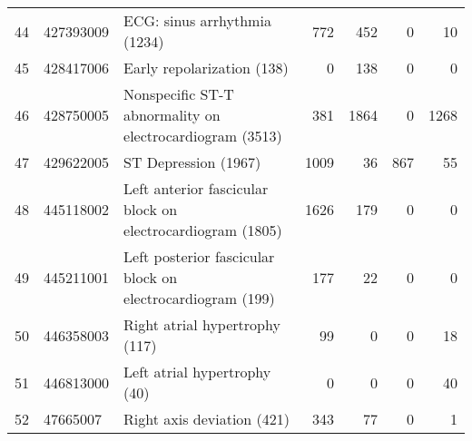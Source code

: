 \begin{tabular}{lllrrrr}
44 & 427393009 & ECG: sinus arrhythmia (1234) & {\cellcolor[HTML]{2E8B57}} \color[HTML]{F1F1F1} 772 & {\cellcolor[HTML]{7DB695}} \color[HTML]{F1F1F1} 452 & {\cellcolor[HTML]{EBF3ED}} \color[HTML]{000000} 0 & {\cellcolor[HTML]{E9F1EB}} \color[HTML]{000000} 10 \\
45 & 428417006 & Early repolarization (138) & {\cellcolor[HTML]{EBF3ED}} \color[HTML]{000000} 0 & {\cellcolor[HTML]{2E8B57}} \color[HTML]{F1F1F1} 138 & {\cellcolor[HTML]{EBF3ED}} \color[HTML]{000000} 0 & {\cellcolor[HTML]{EBF3ED}} \color[HTML]{000000} 0 \\
46 & 428750005 & Nonspecific ST-T abnormality on electrocardiogram (3513) & {\cellcolor[HTML]{C4DDCF}} \color[HTML]{000000} 381 & {\cellcolor[HTML]{2E8B57}} \color[HTML]{F1F1F1} 1864 & {\cellcolor[HTML]{EBF3ED}} \color[HTML]{000000} 0 & {\cellcolor[HTML]{6AAC87}} \color[HTML]{F1F1F1} 1268 \\
47 & 429622005 & ST Depression (1967) & {\cellcolor[HTML]{2E8B57}} \color[HTML]{F1F1F1} 1009 & {\cellcolor[HTML]{EBF3ED}} \color[HTML]{000000} 36 & {\cellcolor[HTML]{499A6D}} \color[HTML]{F1F1F1} 867 & {\cellcolor[HTML]{E8F1EB}} \color[HTML]{000000} 55 \\
48 & 445118002 & Left anterior fascicular block on electrocardiogram (1805) & {\cellcolor[HTML]{2E8B57}} \color[HTML]{F1F1F1} 1626 & {\cellcolor[HTML]{D6E7DD}} \color[HTML]{000000} 179 & {\cellcolor[HTML]{EBF3ED}} \color[HTML]{000000} 0 & {\cellcolor[HTML]{EBF3ED}} \color[HTML]{000000} 0 \\
49 & 445211001 & Left posterior fascicular block on electrocardiogram (199) & {\cellcolor[HTML]{2E8B57}} \color[HTML]{F1F1F1} 177 & {\cellcolor[HTML]{D4E6DB}} \color[HTML]{000000} 22 & {\cellcolor[HTML]{EBF3ED}} \color[HTML]{000000} 0 & {\cellcolor[HTML]{EBF3ED}} \color[HTML]{000000} 0 \\
50 & 446358003 & Right atrial hypertrophy (117) & {\cellcolor[HTML]{2E8B57}} \color[HTML]{F1F1F1} 99 & {\cellcolor[HTML]{EBF3ED}} \color[HTML]{000000} 0 & {\cellcolor[HTML]{EBF3ED}} \color[HTML]{000000} 0 & {\cellcolor[HTML]{C9E0D2}} \color[HTML]{000000} 18 \\
51 & 446813000 & Left atrial hypertrophy (40) & {\cellcolor[HTML]{EBF3ED}} \color[HTML]{000000} 0 & {\cellcolor[HTML]{EBF3ED}} \color[HTML]{000000} 0 & {\cellcolor[HTML]{EBF3ED}} \color[HTML]{000000} 0 & {\cellcolor[HTML]{2E8B57}} \color[HTML]{F1F1F1} 40 \\
52 & 47665007 & Right axis deviation (421) & {\cellcolor[HTML]{2E8B57}} \color[HTML]{F1F1F1} 343 & {\cellcolor[HTML]{C1DBCC}} \color[HTML]{000000} 77 & {\cellcolor[HTML]{EBF3ED}} \color[HTML]{000000} 0 & {\cellcolor[HTML]{EBF3ED}} \color[HTML]{000000} 1 \\

\end{tabular}
